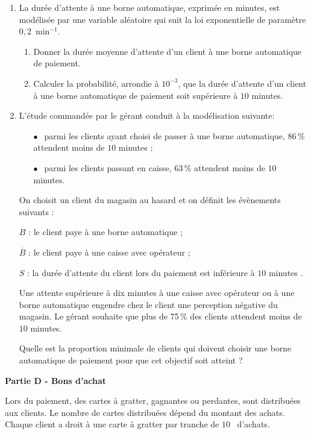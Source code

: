 \documentclass[10pt]{article}
\newcommand{\euro}{\eurologo{}}
\begin{document}
\begin{enumerate}
\item La durée d'attente à une borne automatique, exprimée en minutes, est modélisée par une
variable aléatoire qui suit la loi exponentielle de paramètre $0,2$~min$^{-1}$.
	\begin{enumerate}
		\item Donner la durée moyenne d'attente d'un client à une borne automatique de paiement.
		\item Calculer la probabilité, arrondie à $10^{-3}$, que la durée d'attente d'un client à une borne automatique de paiement soit supérieure à $10$ minutes.
	\end{enumerate}
\item L'étude commandée par le gérant conduit à la modélisation suivante:
	
\setlength\parindent{9mm}
\begin{itemize}
\item[$\bullet~~$] parmi les clients ayant choisi de passer à une borne automatique, 86\,\% attendent moins de $10$ minutes ;
\item[$\bullet~~$] parmi les clients passant en caisse, 63\,\% attendent moins de $10$ minutes.
\end{itemize}
\setlength\parindent{0mm}

\medskip

On choisit un client du magasin au hasard et on définit les évènements suivants :

$B$ : \og le client paye à une borne automatique \fg{} ;

$\overline{B}$ : \og le client paye à une caisse avec opérateur \fg{} ;

$S$ : \og la durée d'attente du client lors du paiement est inférieure à $10$ minutes \fg.

Une attente supérieure à dix minutes à une caisse avec opérateur ou à une borne automatique
engendre chez le client une perception négative du magasin. Le gérant souhaite que
plus de 75\,\% des clients attendent moins de $10$ minutes.

Quelle est la proportion minimale de clients qui doivent choisir une borne automatique de
paiement pour que cet objectif soit atteint ?
 \end{enumerate}
 
\bigskip

\textbf{Partie D - Bons d'achat}

\medskip

Lors du paiement, des cartes à gratter, gagnantes ou perdantes, sont distribuées aux clients. Le
nombre de cartes distribuées dépend du montant des achats. Chaque client a droit à une carte à
gratter par tranche de $10$~\euro{} d'achats.
\end{document}
